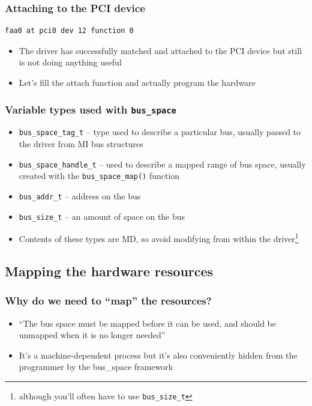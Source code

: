 \documentclass[dvipsnames,table]{beamer}
\begin{document}
\begin{frame}[fragile]
\frametitle{Attaching to the PCI device}
\begin{verbatim}
faa0 at pci0 dev 12 function 0
\end{verbatim}
\begin{itemize}
	\item The driver has successfully matched and attached to the PCI device but still is not doing anything useful
	\item Let's fill the attach function and actually program the hardware
\end{itemize}
\end{frame}

\begin{frame}
\frametitle{Variable types used with {\tt bus\_space}}

\begin{itemize}
         \item {\tt bus\_space\_tag\_t} -- type used to describe a particular bus, usually passed to the driver from MI bus structures
         \item {\tt bus\_space\_handle\_t} --  used to describe a mapped range of bus space, usually created with the {\tt bus\_space\_map()} function
         \item {\tt bus\_addr\_t} -- address on the bus
         \item {\tt bus\_size\_t} -- an amount of space on the bus
         \item Contents of these types are MD, so avoid modifying from within the driver\footnote{although you'll often have to use {\tt bus\_size\_t}}
\end{itemize}
\end{frame}


\subsection{Mapping the hardware resources}

\begin{frame}
\frametitle{Why do we need to ``map'' the resources?}
\begin{itemize}
\huge
	\item ``The bus space must be mapped before it can be used, and should be unmapped       when it is no longer needed''
\normalsize
	\item It's a machine-dependent process but it's also conveniently hidden from the programmer by the bus\_space framework

\end{itemize}
\end{frame}
\end{document}
